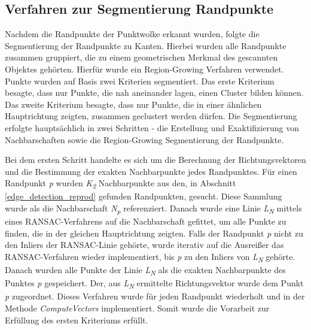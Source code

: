 \subsection{Verfahren zur Segmentierung Randpunkte} \label{edge_segmentation}
Nachdem die Randpunkte der Punktwolke erkannt wurden, folgte die Segmentierung der Randpunkte zu Kanten. Hierbei wurden alle Randpunkte zusammen gruppiert, die zu einem geometrischen Merkmal des gescannten Objektes gehörten. Hierfür wurde ein Region-Growing Verfahren verwendet. Punkte wurden auf Basis zwei Kriterien segmentiert. Das erste Kriterium besagte, dass nur Punkte, die nah aneinander lagen, einen Cluster bilden können. Das zweite Kriterium besagte, dass nur Punkte, die in einer ähnlichen Hauptrichtung zeigten, zusammen geclustert werden dürfen. Die Segmentierung erfolgte hauptsächlich in zwei Schritten - die Erstellung und Exaktifizierung von Nachbarschaften sowie die Region-Growing Segmentierung der Randpunkte.

Bei dem ersten Schritt handelte es sich um die Berechnung der Richtungsvektoren und die Bestimmung der exakten Nachbarpunkte jedes Randpunktes. Für einen Randpunkt \textit{p} wurden \textit{K\textsubscript{2}} Nachbarpunkte aus den, in Abschnitt \ref{edge_detection_reprod} gefunden Randpunkten, gesucht. Diese Sammlung wurde als die Nachbarschaft \textit{N\textsubscript{p}} referenziert. Danach wurde eine Linie \textit{L\textsubscript{N}} mittels eines RANSAC-Verfahrens auf die Nachbarschaft gefittet, um alle Punkte zu finden, die in der gleichen Hauptrichtung zeigten. Falls der Randpunkt \textit{p} nicht zu den Inliers der RANSAC-Linie gehörte, wurde iterativ auf die Ausreißer das RANSAC-Verfahren wieder implementiert, bis \textit{p} zu den Inliers von \textit{L\textsubscript{N}} gehörte. Danach wurden alle Punkte der Linie \textit{L\textsubscript{N}} als die exakten Nachbarpunkte des Punktes \textit{p} gespeichert. Der, aus \textit{L\textsubscript{N}} ermittelte Richtungsvektor wurde dem Punkt \textit{p} zugeordnet. Dieses Verfahren wurde für jeden Randpunkt wiederholt und in der Methode \textit{ComputeVectors} implementiert. Somit wurde die Vorarbeit zur Erfüllung des ersten Kriteriums erfüllt.

